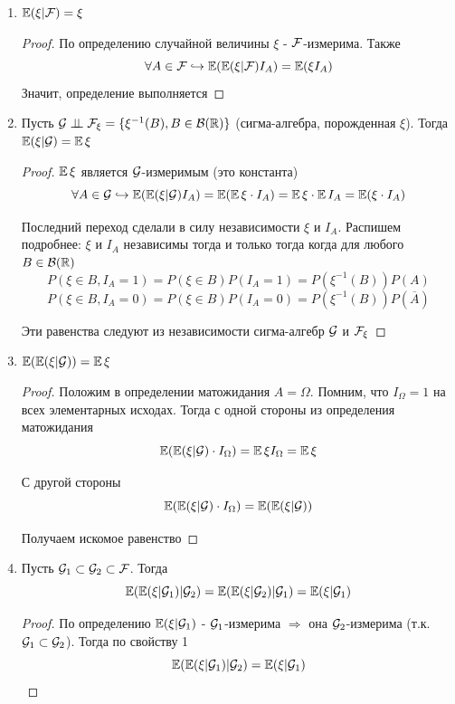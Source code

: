 \begin{enumerate}
    \item \( \E(\xi | \F) = \xi \)
    \begin{proof}
        По определению случайной величины $\xi$ - $\F$-измерима. Также
        \[ \forall A \in \F \hookrightarrow \E(\E(\xi | \F)I_A)=\E(\xi I_A) \]
        Значит, определение выполняется
    \end{proof}
    
    \item Пусть $\mathcal{G}\indep \F_\xi=\{\xi^{-1}(B), B \in \B(\R)\}$ (сигма-алгебра, порожденная $\xi$). Тогда \( \E(\xi | \mathcal{G})=\E \xi \)
    \begin{proof}
        $\E \xi$ является $\G$-измеримым (это константа)
        \[ \forall A \in \G \hookrightarrow \E(\E(\xi|\G)I_A)=\E(\E\xi \cdot I_A)=\E\xi \cdot \E I_A=\E(\xi \cdot I_A) \]
        
        Последний переход сделали в силу независимости $\xi$ и $I_A$. Распишем подробнее: $\xi$ и $I_A$ независимы тогда и только тогда когда для любого $B \in \B(\R)$
        \[ P(\xi \in B, I_A=1)=P(\xi \in B)P(I_A=1)=P(\xi^{-1}(B))P(A) \]
        \[ P(\xi \in B, I_A=0)=P(\xi \in B)P(I_A=0)=P(\xi^{-1}(B))P(\overline{A}) \]
        
        Эти равенства следуют из независимости сигма-алгебр $\G$ и $\F_\xi$
    \end{proof}
    
    \item \( \E(\E(\xi|\G))=\E\xi \)
    \begin{proof}
        Положим в определении матожидания $A=\Omega$. Помним, что $I_\Omega=1$ на всех элементарных исходах. Тогда с одной стороны из определения матожидания
        \[ \E(\E(\xi|\G)\cdot I_\Omega)=\E \xi I_\Omega = \E \xi \]
        
        С другой стороны
        \[ \E(\E(\xi | \G)\cdot I_\Omega)=\E(\E(\xi|\G)) \]
        
        Получаем искомое равенство
    \end{proof}
    
    \item Пусть $\G_1 \subset \G_2 \subset \F$. Тогда 
    \[ \E(\E(\xi|\G_1) | \G_2)=\E(\E(\xi|\G_2)|\G_1)=\E(\xi|\G_1) \]
    \begin{proof}
        По определению \( \E(\xi|\G_1) \) - $\G_1$-измерима $\Rightarrow$ она $\G_2$-измерима (т.к. $\G_1 \subset \G_2$). Тогда по свойству 1
        \[ \E(\E(\xi|\G_1)|\G_2)=\E(\xi|\G_1) \]
        

\end{proof}
\end{enumerate}
